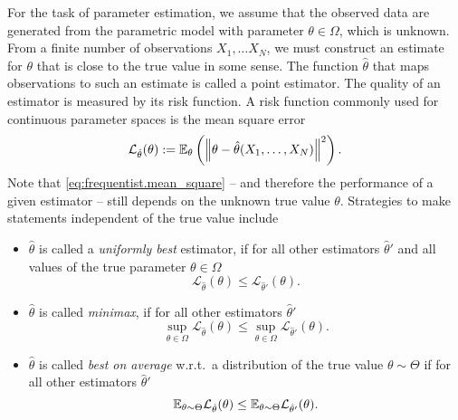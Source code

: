 For the task of parameter estimation, we assume that the observed data are generated from the parametric model with  parameter $\theta \in \Omega$, which is unknown.
From a finite number of observations $X_1, \ldots X_N$, we must construct an estimate for $\theta$ that is close to the true value in some sense.
The function $\hat\theta$ that maps observations to such an estimate is called a point estimator.
The quality of an estimator is measured by its risk function.
A risk function commonly used for continuous parameter spaces is the mean square error
\[
  \label{eq:frequentist.mean_square}
  \mathcal{L}_{\hat\theta}(\theta) := \mathbb{E}_\theta \left( {\left\Vert\theta - \hat\theta(X_1, \ldots, X_N)\right\Vert}^2 \right).
\]
Note that \cref{eq:frequentist.mean_square} -- and therefore the performance of a given estimator -- still depends on the unknown true value $\theta$.
Strategies to make statements independent of the true value include 
\begin{itemize}
  \item $\hat\theta$ is called a \emph{uniformly best} estimator, if for all other estimators $\hat\theta'$ and all values of the true parameter $\theta \in \Omega$
  \[
    \mathcal{L}_{\hat\theta}(\theta) \le \mathcal{L}_{\hat\theta'}(\theta).
  \]

  \item $\hat\theta$ is called \emph{minimax}, if for all other estimators $\hat\theta'$
  \[
    \sup_{\theta\in\Omega} \mathcal{L}_{\hat\theta}(\theta) \le \sup_{\theta\in\Omega} \mathcal{L}_{\hat\theta'}(\theta).
  \]

  \item $\hat\theta$ is called \emph{best on average} w.r.t.\ a distribution of the true value $\theta \sim \Theta$ if for all other estimators $\hat\theta'$
  \[
    \mathbb{E}_{\theta \sim \Theta} \mathcal{L}_{\hat\theta}(\theta) \le  \mathbb{E}_{\theta \sim \Theta} \mathcal{L}_{\hat\theta'}(\theta).
  \]
\end{itemize}


